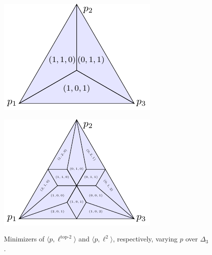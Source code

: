 \documentclass[11pt]{article}
\newcommand{\inprod}[2]{\langle #1, #2 \rangle}%
\newcommand{\elltop}[1]{\ell^{\text{top-$#1$}}}
\begin{document}
\begin{figure}[H]
	\begin{minipage}{0.45\linewidth}
		\centering
		\includegraphics[width=\linewidth]{tikz/original-top-k}
		\label{fig:original-top-k}
	\end{minipage}
	\hfill
	\begin{minipage}{0.45\linewidth}
		\centering
		\includegraphics[width=\linewidth]{tikz/finite-surrogate-top-k}
		\label{fig:finite-surrogate-top-k}
	\end{minipage}
	\caption{Minimizers of $\inprod{p}{\elltop{2}}$ and $\inprod{p}{\ell^2}$, respectively, varying $p$ over $\Delta_3$.}
	\label{fig:top-k-simplices}
\end{figure}
\end{document}
